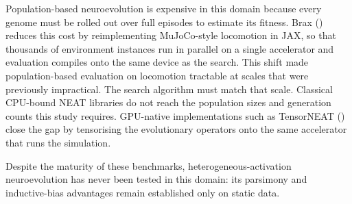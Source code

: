 \documentclass[12pt]{article}
\begin{document}
Population-based neuroevolution is expensive in this domain because every genome must be rolled out over full episodes to estimate its fitness.
Brax (\cite{freeman_brax_2021}) reduces this cost by reimplementing MuJoCo-style locomotion in JAX, so that thousands of environment instances run in parallel on a single accelerator and evaluation compiles onto the same device as the search.
This shift made population-based evaluation on locomotion tractable at scales that were previously impractical.
The search algorithm must match that scale.
Classical CPU-bound NEAT libraries do not reach the population sizes and generation counts this study requires.
GPU-native implementations such as TensorNEAT (\cite{wang_tensorized_2024}) close the gap by tensorising the evolutionary operators onto the same accelerator that runs the simulation.

Despite the maturity of these benchmarks, heterogeneous-activation neuroevolution has never been tested in this domain: its parsimony and inductive-bias advantages remain established only on static data.



\end{document}
